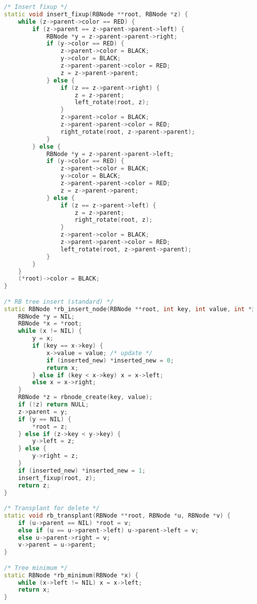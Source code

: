 \documentclass[12pt,a4paper]{article}
\begin{document}
\begin{lstlisting}[language=C++]
/* Insert fixup */
static void insert_fixup(RBNode **root, RBNode *z) {
    while (z->parent->color == RED) {
        if (z->parent == z->parent->parent->left) {
            RBNode *y = z->parent->parent->right;
            if (y->color == RED) {
                z->parent->color = BLACK;
                y->color = BLACK;
                z->parent->parent->color = RED;
                z = z->parent->parent;
            } else {
                if (z == z->parent->right) {
                    z = z->parent;
                    left_rotate(root, z);
                }
                z->parent->color = BLACK;
                z->parent->parent->color = RED;
                right_rotate(root, z->parent->parent);
            }
        } else {
            RBNode *y = z->parent->parent->left;
            if (y->color == RED) {
                z->parent->color = BLACK;
                y->color = BLACK;
                z->parent->parent->color = RED;
                z = z->parent->parent;
            } else {
                if (z == z->parent->left) {
                    z = z->parent;
                    right_rotate(root, z);
                }
                z->parent->color = BLACK;
                z->parent->parent->color = RED;
                left_rotate(root, z->parent->parent);
            }
        }
    }
    (*root)->color = BLACK;
}

/* RB tree insert (standard) */
static RBNode *rb_insert_node(RBNode **root, int key, int value, int *inserted_new) {
    RBNode *y = NIL;
    RBNode *x = *root;
    while (x != NIL) {
        y = x;
        if (key == x->key) {
            x->value = value; /* update */
            if (inserted_new) *inserted_new = 0;
            return x;
        } else if (key < x->key) x = x->left;
        else x = x->right;
    }
    RBNode *z = rbnode_create(key, value);
    if (!z) return NULL;
    z->parent = y;
    if (y == NIL) {
        *root = z;
    } else if (z->key < y->key) {
        y->left = z;
    } else {
        y->right = z;
    }
    if (inserted_new) *inserted_new = 1;
    insert_fixup(root, z);
    return z;
}

/* Transplant for delete */
static void rb_transplant(RBNode **root, RBNode *u, RBNode *v) {
    if (u->parent == NIL) *root = v;
    else if (u == u->parent->left) u->parent->left = v;
    else u->parent->right = v;
    v->parent = u->parent;
}

/* Tree minimum */
static RBNode *rb_minimum(RBNode *x) {
    while (x->left != NIL) x = x->left;
    return x;
}


\end{lstlisting}
\end{document}
